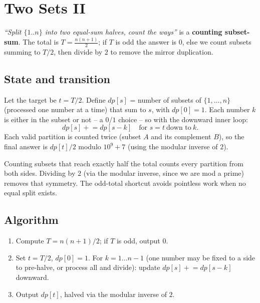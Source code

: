 \section{Two Sets II}
\label{sec:cses-two-sets-ii}


\begin{patternbox}
\emph{``Split $\{1..n\}$ into two equal-sum halves, count the ways''} is a
\textbf{counting subset-sum}. The total is
$T=\frac{n(n+1)}{2}$; if $T$ is odd the answer is $0$, else we count
subsets summing to $T/2$, then divide by $2$ to remove the mirror
duplication.
\end{patternbox}

\subsection*{State and transition}

Let the target be $t=T/2$. Define $\textit{dp}[s]$ = number of subsets of
$\{1,\ldots,n\}$ (processed one number at a time) that sum to $s$, with
$\textit{dp}[0]=1$. Each number $k$ is either in the subset or not -- a
$0/1$ choice -- so with the downward inner loop:
\[
  \textit{dp}[s]\mathrel{+}=\textit{dp}[s-k]\quad\text{for } s=t\ \text{down to}\ k.
\]
Each valid partition is counted twice (subset $A$ and its complement
$B$), so the final answer is $\textit{dp}[t]/2$ modulo $10^9+7$ (using the
modular inverse of $2$).

\begin{ideabox}
Counting subsets that reach exactly half the total counts every partition
from both sides. Dividing by $2$ (via the modular inverse, since we are
mod a prime) removes that symmetry. The odd-total shortcut avoids
pointless work when no equal split exists.
\end{ideabox}

\subsection*{Algorithm}

\begin{enumerate}
  \item Compute $T=n(n+1)/2$; if $T$ is odd, output $0$.
  \item Set $t=T/2$, $\textit{dp}[0]=1$. For $k=1\ldots n-1$ (one number
        may be fixed to a side to pre-halve, or process all and divide):
        update $\textit{dp}[s]\mathrel{+}=\textit{dp}[s-k]$ downward.
  \item Output $\textit{dp}[t]$, halved via the modular inverse of $2$.
\end{enumerate}

